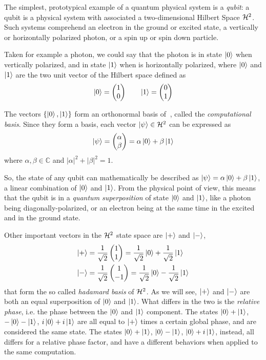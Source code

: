 The simplest, prototypical example of a quantum physical system is a \textit{qubit}: a qubit is a physical system with associated a two-dimensional Hilbert Space $\mathcal{H}^2$. Such systems comprehend an electron in the ground or excited state, a vertically or horizontally polarized photon, or a spin up or spin down particle.

Taken for example a photon, we could say that the photon is in state $\ket{0}$ when vertically polarized, and in state $\ket{1}$ when is horizontally polarized, where $\ket{0}$ and $\ket{1}$ are the two unit vector of the Hilbert space defined as
\[
	\ket{0} = \begin{pmatrix}
	1 \\
	0
	\end{pmatrix} \qquad
	\ket{1} = \begin{pmatrix}
	0 \\
	1
	\end{pmatrix}
\]

The vectors $\{\ket{0}, \ket{1}\}$ form an orthonormal basis of $\ $, called the \textit{computational basis}. Since they form a basis, each vector $\ket{\psi} \in \mathcal{H}^2$ can be expressed as 
	\[\ket{\psi} = \begin{pmatrix}
	\alpha \\
	\beta
	\end{pmatrix} = 
	\alpha\ket{0} + \beta\ket{1}
	\]
where $\alpha, \beta \in \mathbb{C}$ and $|\alpha|^2 + |\beta|^2 = 1$.

So, the state of any qubit can mathematically be described as $\ket{\psi} = \alpha\ket{0} +\beta\ket{1}$, a linear combination of $\ket{0}$ and $\ket{1}$. From the physical point of view, this means that the qubit is in a \textit{quantum superposition} of state $\ket{0}$ and $\ket{1}$, like a photon being diagonally-polarized, or an electron being at the same time in the excited and in the ground state.

Other important vectors in the $\mathcal{H}^2$ state space are $\ket{+}$ and $\ket{-}$,
\begin{align*}
	\ket{+} = \frac{1}{\sqrt{2}} &\begin{pmatrix}
	1 \\
	1
	\end{pmatrix}  = \frac{1}{\sqrt{2}}\ket{0} + \frac{1}{\sqrt{2}}\ket{1}   \\
	\ket{-}  = \frac{1}{\sqrt{2}} &\begin{pmatrix}
	1 \\
	-1
	\end{pmatrix}  = \frac{1}{\sqrt{2}}\ket{0} - \frac{1}{\sqrt{2}}\ket{1} 
\end{align*}
that form the so called \textit{hadamard basis} of $\mathcal{H}^2$. As we will see, $\ket{+}$ and $\ket{-}$ are both an equal superposition of $\ket{0}$ and $\ket{1}$. What differs in the two is the \textit{relative phase}, i.e. the phase between the $\ket{0}$ and $\ket{1}$ component. The states $\ket{0} + \ket{1}$, $-\ket{0} -\ket{1}$, $i\ket{0} + i\ket{1}$ are all equal to $\ket{+}$ times a certain global phase, and are considered the same state. The states $\ket{0} + \ket{1}$, $\ket{0} - \ket{1}$, $\ket{0} +i\ket{1}$, instead, all differs for a relative phase factor, and have a different behaviors when applied to the same computation. 
